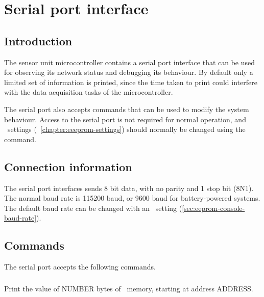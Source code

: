 \chapter{Serial port interface}

\section{Introduction}

The sensor unit microcontroller contains a serial port interface that
can be used for observing its network status and debugging its
behaviour. By default only a limited set of information is printed,
since the time taken to print could interfere with the data
acquisition tasks of the microcontroller.

The serial port also accepts commands that can be used to modify the
system behaviour. Access to the serial port is not required for normal
operation, and \eeprom\ settings
(\chaptername~\ref{chapter:eeeprom-settings}) should normally be
changed using the  command.

\section{Connection information}

The serial port interfaces sends 8 bit data, with no parity and 1 stop
bit (8N1). The normal baud rate is 115200 baud, or 9600 baud for
battery-powered systems. The default baud rate can be changed with an
\eeprom\ setting (\ref{sec:eeprom-console-baud-rate}).

\section{Commands}

The serial port accepts the following commands.


\subsection[eepromRead]{}

Print the value of NUMBER bytes of \eeprom\ memory, starting at
address ADDRESS.

